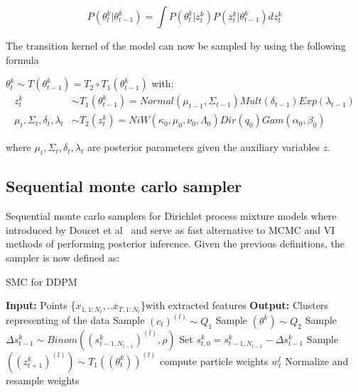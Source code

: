 \documentclass[]{article}
\begin{document}
$$ P(\theta_t^k | \theta_{t-1}^k) =  \int P(\theta_t^k | z_{t}^k)   P(z_t^k| \theta_{t-1}^k) dz_t^k $$

The transition kernel of the model can now be sampled by using the following formula

$\theta_t^k \sim T(\theta_{t-1}^k) = T_2 \circ T_1(\theta_{t-1}^k)$ with:
\begin{equation} \label{eq1}
    \begin{split}
        z_t^k  & \sim T_1(\theta_{t-1}^k)
        = Normal(\mu_{t-1}, \Sigma_{t-1}) Mult( \delta_{t-1}) Exp( \lambda_{t-1})\\
        \mu_t, \Sigma_t, \delta_t,  \lambda_t & \sim T_2(z_t^k)
        = NiW( \kappa_0, \mu_0, \nu_0, \Lambda_0 ) Dir(q_0) Gam(\alpha_0, \beta_0) 
    \end{split}
\end{equation}

where $\mu_t, \Sigma_t, \delta_t,  \lambda_t$  are posterior parameters given the auxiliary variables $z$.

\subsection{Sequential monte carlo sampler}

Sequential monte carlo samplers for Dirichlet process mixture models where introduced by Doucet et al~\cite{doucet} and serve as fast alternative to MCMC and VI methods of performing posterior inference. Given the previous definitions, the sampler is now defined as:


\begin{algorithm}[h]
    \caption{SMC for DDPM}\label{SMC}
    \begin{algorithmic}[1]
        \State \textbf{Input:} Points \{$x_{1,1:N_t}, ..x_{T,1:N_t}$\}with extracted features
        \State \textbf{Output:} Clusters representing of the data
        \State Sample $(c_t)^{(l)} \sim Q_1$  
        \State Sample $(\theta^k ) \sim Q_2$
        \EndFor		
        \EndFor
        \State Sample $\Delta s_{t-1}^k \sim Binom( (s_{t-1,N_{t-1}}^k)^{(l)}, \rho) $ 
        \State Set $s_{t,0}^{k} = s_{t-1,N_{t-1}}^{k} -\Delta s_{t-1}^k$
        \State Sample $( (z_{t+1}^k)^{(l)} ) \sim T_1((\theta_t^k))^{(l)} $
        \EndFor
        \State compute particle weights $w_t^l$
        \EndFor
        \State Normalize and resample weights
    \end{algorithmic}
\end{algorithm}
\end{document}
